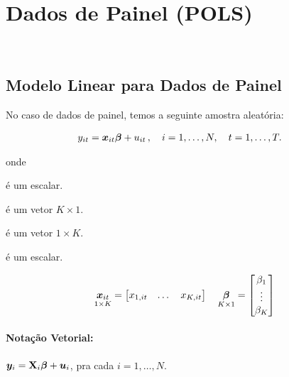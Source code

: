 \documentclass[11pt, oneside, a4paper, article]{article}
\numberwithin{equation}{section}
\begin{document}
\clearpage
\section{Dados de Painel (POLS)}
\noindent
\citet[C.7 -- Estimating Systems of Equations by OLS and GLS. p.143-179]{wool-2010} \\
\citet[Sec.7.8 -- The Linear Panel Data Model, Revisited. p.169]{wool-2010} 

\subsection{Modelo Linear para Dados de Painel}

No caso de dados de painel, temos a seguinte amostra aleatória:

\vspace{-1 em}
\begin{align}\label{pols:mod}
	y_{it} &= \boldsymbol{x}_{it} \boldsymbol{\beta} + u_{it} \, , \quad i=1, \dots, N, \quad t=1, \dots, T.
\end{align}

\noindent onde
\vspace{-1 ex}
\begin{description}[noitemsep]
	\item[$y_{it}$] é um escalar.
	\item[$\betavec$] é um vetor $K \times 1$.
	\item[$\xvec_{it}$] é um vetor $1 \times K$.
	\item[$u_{it}$] é um escalar.
\end{description}

\vspace{-2 em}
\begin{align*}
	\underset{1 \times K}{\boldsymbol{x}_{it}} = 
	\begin{bmatrix}
		x_{1,it} & \dots & x_{K, it}
	\end{bmatrix}
	\quad
	\underset{K \times 1}{\boldsymbol{\beta}} = 
	\begin{bmatrix}
		\beta_{1} \\ \vdots \\ \beta_{K}
	\end{bmatrix}
\end{align*}

\paragraph{Notação Vetorial:}
$\boldsymbol{y}_{i} = \mathbf{X}_{i} \boldsymbol{\beta} + \boldsymbol{u}_{i}$,  pra cada $i=1, \dots, N$.
\end{document}
